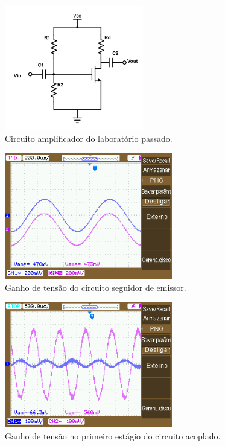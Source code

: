 \documentclass{article}
\begin{document}
    
    \begin{figure}[h!]
        \centering
        \includegraphics[height=5.5cm]{imgSource/circuitolab3.png}
        \caption{Circuito amplificador do laboratório passado.}
        \label{fig:circLab3}
    \end{figure}
    
    \begin{figure}[h!]
        \centering
        \includegraphics[height=5.5cm]{imgSource/NewFile1.png}
        \caption{Ganho de tensão do circuito seguidor de emissor.}
        \label{fig:NewFile1}
    \end{figure}
    
    \begin{figure}[h!]
        \centering
        \includegraphics[height=5.5cm]{imgSource/NewFile2.png}
        \caption{Ganho de tensão no primeiro estágio do circuito acoplado.}
        \label{fig:NewFile2}
    \end{figure}
    
\end{document}

